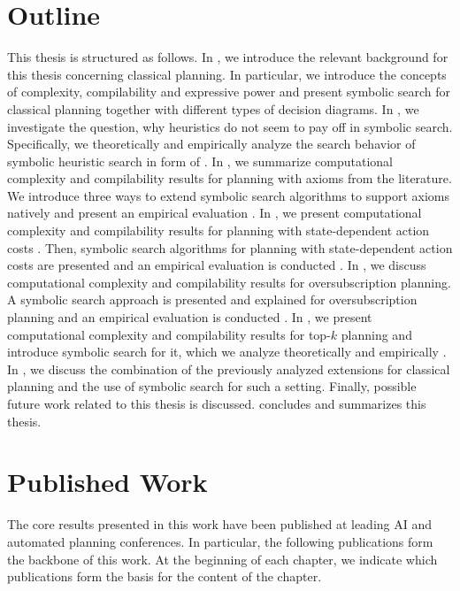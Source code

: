 \section{Outline}
This thesis is structured as follows.
%
In , we introduce the relevant background for this thesis concerning classical planning. In particular, we introduce the concepts of complexity, compilability and expressive power and present symbolic search for classical planning
together with different types of decision diagrams.
%
In , we investigate the question, why heuristics do not seem to pay off in symbolic search.
Specifically, we theoretically and empirically analyze the search behavior of symbolic heuristic search in form of \bddastar{} \autocite{speck-et-al-icaps2020}.
%
In , we summarize computational complexity and compilability results for planning with axioms from the literature.
We introduce three ways to extend symbolic search algorithms to support axioms natively and present an empirical evaluation \autocite{speck-et-al-icaps2019}.
%
In , we present computational complexity and compilability results for planning with state-dependent action costs \autocite{speck-et-al-icaps2021}.
Then, symbolic search algorithms for planning with state-dependent action costs are presented and an empirical evaluation is conducted \autocite{speck-et-al-icaps2018}.
%
In , we discuss computational complexity and compilability results for oversubscription planning.
A symbolic search approach is presented and explained for oversubscription planning and an empirical evaluation is conducted \autocite{speck-katz-aaai2021}.
%
In , we present computational complexity and compilability results for top-$k$ planning and introduce symbolic search for it, which we analyze theoretically and empirically \autocite{speck-et-al-aaai2020}.
%
In , we discuss the combination of the previously analyzed extensions for classical planning and the use of symbolic search for such a setting.
Finally, possible future work related to this thesis is
discussed.
%
 concludes and summarizes this thesis.

\section{Published Work}
The core results presented in this work have been published at leading AI and automated planning conferences.
In particular, the following publications form the backbone of this work.
At the beginning of each chapter, we indicate which publications form the basis for the content of the chapter.

